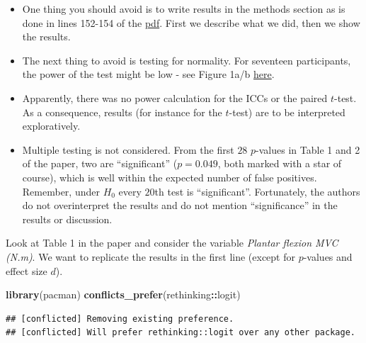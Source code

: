 \documentclass[
]{book}
\newenvironment{Shaded}{\begin{snugshade}}{\end{snugshade}}
\newcommand{\FunctionTok}[1]{\textcolor[rgb]{0.13,0.29,0.53}{\textbf{#1}}}
\newcommand{\NormalTok}[1]{#1}
\newcommand{\SpecialCharTok}[1]{\textcolor[rgb]{0.81,0.36,0.00}{\textbf{#1}}}
\begin{document}
\begin{itemize}
\item
  One thing you should avoid is to write results in the methods section as
  is done in lines 152-154 of the \href{https://www.biorxiv.org/content/10.1101/2024.06.23.600286v2.full.pdf}{pdf}.
  First we describe what we did, then we show the results.
\item
  The next thing to avoid is testing for normality. For seventeen participants,
  the power of the test might be low - see Figure 1a/b \href{https://www.nbi.dk/~petersen/Teaching/Stat2017/Power_Comparisons_of_Shapiro-Wilk_Kolmogorov-Smirn.pdf}{here}.
\item
  Apparently, there was no power calculation for the ICCs or the paired \(t\)-test.
  As a consequence, results (for instance for the \(t\)-test) are to be interpreted exploratively.
\item
  Multiple testing is not considered.
  From the first \(28\) \(p\)-values in Table 1 and 2 of the paper, two are ``significant''
  (\(p=0.049\), both marked with a star of course),
  which is well within the expected number of false positives. Remember,
  under \(H_0\) every \(20\)th test is ``significant''.
  Fortunately, the authors do not overinterpret the results and
  do not mention ``significance'' in the results or discussion.
\end{itemize}

Look at Table 1 in the paper and consider the variable \emph{Plantar flexion MVC (N.m)}.
We want to replicate the results in the first line
(except for \(p\)-values and effect size \(d\)).

\begin{Shaded}
\begin{Highlighting}[]
\FunctionTok{library}\NormalTok{(pacman)}
\FunctionTok{conflicts\_prefer}\NormalTok{(rethinking}\SpecialCharTok{::}\NormalTok{logit)}
\end{Highlighting}
\end{Shaded}

\begin{verbatim}
## [conflicted] Removing existing preference.
## [conflicted] Will prefer rethinking::logit over any other package.
\end{verbatim}
\end{document}
